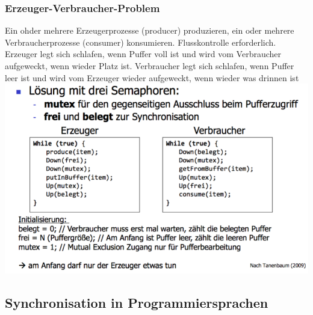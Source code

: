 \documentclass[11pt,a4paper,landscape]{article}
\begin{document}
\begin{multicols*}{3}
	\subsubsection{Erzeuger-Verbraucher-Problem}
	Ein ohder mehrere Erzeugerprozesse (producer) produzieren, ein oder mehrere Verbraucherprozesse (consumer) konsumieren. Flusskontrolle erforderlich. Erzeuger legt sich schlafen, wenn Puffer voll ist und wird vom Verbraucher aufgeweckt, wenn wieder Platz ist. Verbraucher legt sich schlafen, wenn Puffer leer ist und wird vom Erzeuger wieder aufgeweckt, wenn wieder was drinnen ist\\
	\includegraphics[width=0.9\columnwidth]{erzeuger-verbraucher}
	\subsection{Synchronisation in Programmiersprachen}

\end{multicols*}
\end{document}
